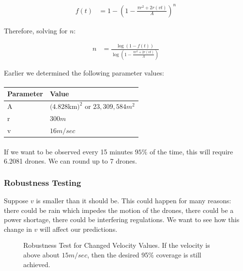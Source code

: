 \documentclass{article}
\begin{document}
\begin{align}
f(t) & = 1 - \left( 1 - \frac{\pi r^2 + 2 r (v t)}{A} \right)^n
\end{align}

Therefore, solving for $n$:

\begin{align}
n & = \frac{\log\left(1 - f(t)\right)}{\log\left( 1 - \frac{\pi r^2 + 2 r (v t)}{A}\right)}
\end{align}

Earlier we determined the following parameter values:

\paragraph{}
\begin{tabular}{l|l}
Parameter & Value \\
\hline
A & $(4.828 $km$)^2$ or $23,309,584 m^2$ \\
r & $300 m$ \\
v & $16 m/sec$
\end{tabular}
\paragraph{}

If we want to be observed every 15 minutes $95 \%$ of the time, 
	this will require 6.2081 drones.
We can round up to 7 drones.

\subsubsection{Robustness Testing}

Suppose $v$ is smaller than it should be.
This could happen for many reasons: there could be rain which impedes
	the motion of the drones, there could be a power shortage, there
	could be interfering regulations.
We want to see how this change in $v$ will affect our predictions.

\begin{figure}[h!]
\begin{centering}
\otherdata
{}
\caption{Robustness Test for Changed Velocity Values.
If the velocity is above about $15 m/sec$, then the desired 95\%
	coverage is still achieved.}
\label{fig:robust}
\end{centering}
\end{figure}
\end{document}

